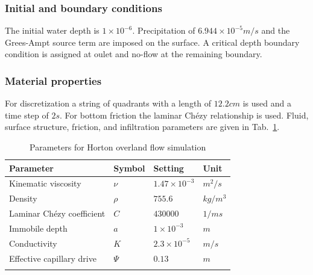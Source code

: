 \subsubsection*{Initial and boundary conditions}
%
The initial water depth is $1\times 10^{-6}$. Precipitation of $6.944\times 10^{-5} m/s$ and the Grees-Ampt source term are imposed on the surface.
A critical depth boundary condition is assigned at oulet and no-flow at the remaining boundary.
%
\subsubsection*{Material properties}
%
For discretization a string of quadrants with a length of $12.2 cm$ is used and a time step of $2s$.
For bottom friction the laminar Ch\'ezy relationship is used.
Fluid, surface structure, friction, and infiltration parameters are given in Tab.~\ref{OLF_WoolhiserSetting}.
%
\begin{table}[H]
 \centering
 \caption{Parameters for Horton overland flow simulation}
 \centering \label{OLF_WoolhiserSetting}
 \begin{tabular}{llll}
 \hline\hline\noalign{\smallskip}
 {\bf Parameter} & {\bf Symbol} & {\bf Setting} & {\bf Unit} \\ \hline
 Kinematic viscosity            & $\nu$ & $1.47\times 10^{-3}$ & $m^2/s$  \\
 Density            & $\rho$ & $755.6$ & $kg/m^3$ \\ \hline
 Laminar Ch\'{e}zy coefficient & $C$ & $430000$ & $1/ms$ \\
 Immobile depth & $a$ & $1\times 10^{-3}$ & $m$ \\ \hline
 Conductivity  & $K$ & $2.3\times 10^{-5}$ & $m/s$\\
 Effective capillary drive & $\Psi$ & $0.13$ & $m$ \\
\noalign{\smallskip}\hline\hline
 \end{tabular}
\end{table}
%
